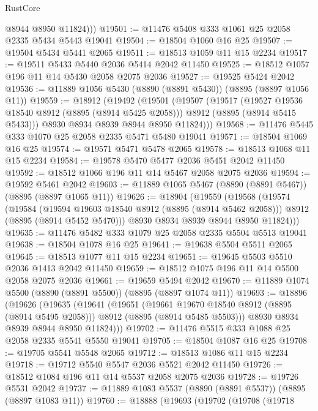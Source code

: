 \begin{lexlean}{RustCore}
\begin{coremodule}
          @8944
          @8950
          @11824)))
@19501 := @11476 @5408 @333 @1061 @25 @2058 @2335 @5434 @5443 @19041
@19504 := @18504 @1060 @16 @25
@19507 := @19504 @5434 @5441 @2065
@19511 := @18513 @1059 @11 @15 @2234
@19517 := @19511 @5433 @5440 @2036 @5414 @2042 @11450
@19525 := @18512 @1057 @196 @11 @14 @5430 @2058 @2075 @2036
@19527 := @19525 @5424 @2042
@19536 := @11889 @1056 @5430 (@8890 (@8891 @5430)) (@8895 (@8897 @1056 @11))
@19559 := @18912
    (@19492
      (@19501
        (@19507
          (@19517
            (@19527 @19536 @18540 @8912 (@8895 (@8914 @5425 @2058)))
            @8912
            (@8895 (@8914 @5415 @5433)))
          @8930
          @8934
          @8939
          @8944
          @8950
          @11824)))
@19568 := @11476 @5445 @333 @1070 @25 @2058 @2335 @5471 @5480 @19041
@19571 := @18504 @1069 @16 @25
@19574 := @19571 @5471 @5478 @2065
@19578 := @18513 @1068 @11 @15 @2234
@19584 := @19578 @5470 @5477 @2036 @5451 @2042 @11450
@19592 := @18512 @1066 @196 @11 @14 @5467 @2058 @2075 @2036
@19594 := @19592 @5461 @2042
@19603 := @11889 @1065 @5467 (@8890 (@8891 @5467)) (@8895 (@8897 @1065 @11))
@19626 := @18904
    (@19559
      (@19568
        (@19574
          (@19584
            (@19594 @19603 @18540 @8912 (@8895 (@8914 @5462 @2058)))
            @8912
            (@8895 (@8914 @5452 @5470)))
          @8930
          @8934
          @8939
          @8944
          @8950
          @11824)))
@19635 := @11476 @5482 @333 @1079 @25 @2058 @2335 @5504 @5513 @19041
@19638 := @18504 @1078 @16 @25
@19641 := @19638 @5504 @5511 @2065
@19645 := @18513 @1077 @11 @15 @2234
@19651 := @19645 @5503 @5510 @2036 @1413 @2042 @11450
@19659 := @18512 @1075 @196 @11 @14 @5500 @2058 @2075 @2036
@19661 := @19659 @5494 @2042
@19670 := @11889 @1074 @5500 (@8890 (@8891 @5500)) (@8895 (@8897 @1074 @11))
@19693 := @18896
    (@19626
      (@19635
        (@19641
          (@19651
            (@19661 @19670 @18540 @8912 (@8895 (@8914 @5495 @2058)))
            @8912
            (@8895 (@8914 @5485 @5503)))
          @8930
          @8934
          @8939
          @8944
          @8950
          @11824)))
@19702 := @11476 @5515 @333 @1088 @25 @2058 @2335 @5541 @5550 @19041
@19705 := @18504 @1087 @16 @25
@19708 := @19705 @5541 @5548 @2065
@19712 := @18513 @1086 @11 @15 @2234
@19718 := @19712 @5540 @5547 @2036 @5521 @2042 @11450
@19726 := @18512 @1084 @196 @11 @14 @5537 @2058 @2075 @2036
@19728 := @19726 @5531 @2042
@19737 := @11889 @1083 @5537 (@8890 (@8891 @5537)) (@8895 (@8897 @1083 @11))
@19760 := @18888
    (@19693
      (@19702
        (@19708
          (@19718

\end{coremodule}
\end{lexlean}
